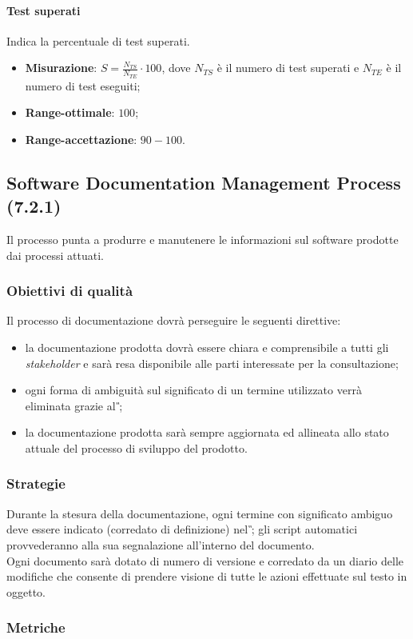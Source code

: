 \paragraph{Test superati}
Indica la percentuale di test superati.
\begin{itemize}
\item \textbf{Misurazione}: $S=\frac{N_{TS}}{N_{TE}} \cdot 100$, dove $N_{TS}$ è il numero di test superati e $N_{TE}$ è il numero di test eseguiti;
\item \textbf{Range-ottimale}: $100$;
\item \textbf{Range-accettazione}: $90 - 100$.
\end{itemize}

\subsection{Software Documentation Management Process (7.2.1)}
Il processo punta a produrre e manutenere le informazioni sul software prodotte dai processi attuati.
\subsubsection{Obiettivi di qualità}
Il processo di documentazione dovrà perseguire le seguenti direttive:
\begin{itemize}
\item la documentazione prodotta dovrà essere chiara e comprensibile a tutti gli \textit{stakeholder} e sarà resa disponibile alle parti interessate per la consultazione;
\item ogni forma di ambiguità sul significato di un termine utilizzato verrà eliminata grazie al \textit{\G};
\item la documentazione prodotta sarà sempre aggiornata ed allineata allo stato attuale del processo di sviluppo del prodotto.
\end{itemize}
\subsubsection{Strategie}
Durante la stesura della documentazione, ogni termine con significato ambiguo deve essere indicato (corredato di definizione) nel \textit{\G}; gli script automatici provvederanno alla sua segnalazione all'interno del documento.\\
Ogni documento sarà dotato di numero di versione e corredato da un diario delle modifiche che consente di prendere visione di tutte le azioni effettuate sul testo in oggetto.
\subsubsection{Metriche}
